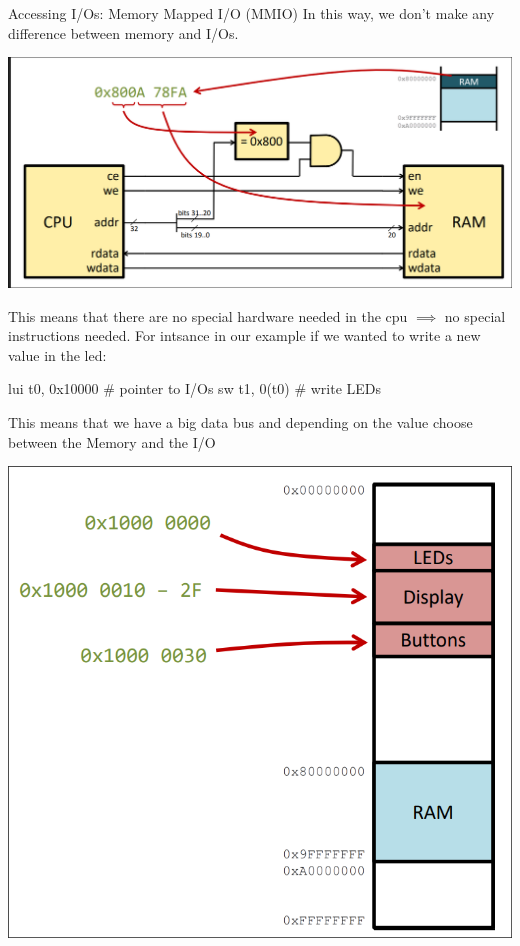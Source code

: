 \begin{parag}{Accessing I/Os: Memory Mapped I/O (MMIO)}
    In this way, we don't make any difference between memory and I/Os.
	\begin{center}
	\includegraphics[scale=0.2]{screenshots/2025-10-22_4.png}
	\end{center}
	This means that there are no special hardware needed in the cpu $\implies$ no special instructions needed. For intsance in our example if we wanted to write a new value in the led:
	\begin{lstlistings}[language={[RISC-V]Assembler}]
lui t0, 0x10000 # pointer to I/Os
sw t1, 0(t0) # write LEDs
	\end{lstlistings}
	This means that we have a big data bus and depending on the value  choose between the Memory and the I/O 
	\begin{center}
	\includegraphics[scale=0.2]{screenshots/2025-10-22_5.png}
	\end{center}
\end{parag}
